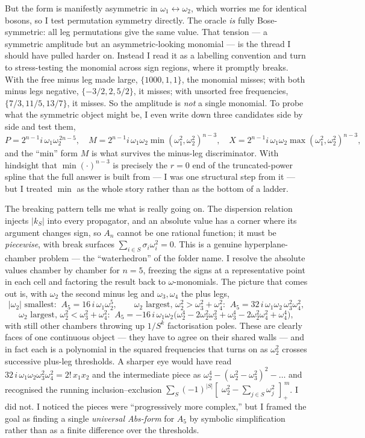 \documentclass{article}
\newcommand{\pp}[1]{\left[\,#1\,\right]_{+}}
\begin{document}
But the form is manifestly asymmetric in $\omega_1\leftrightarrow\omega_2$, which
worries me for identical bosons, so I test permutation symmetry directly. The
oracle \emph{is} fully Bose-symmetric: all leg permutations give the same value.
That tension --- a symmetric amplitude but an asymmetric-looking monomial --- is
the thread I should have pulled harder on. Instead I read it as a labelling
convention and turn to stress-testing the monomial across sign regions, where it
promptly breaks. With the free minus leg made large, $\{1000,1,1\}$, the
monomial misses; with both minus legs negative, $\{-3/2,2,5/2\}$, it misses; with
unsorted free frequencies, $\{7/3,11/5,13/7\}$, it misses. So the amplitude is
\emph{not} a single monomial. To probe what the symmetric object might be, I even
write down three candidates side by side and test them,
\[
P=2^{n-1}i\,\omega_1\omega_2^{\,2n-5},\quad
M=2^{n-1}i\,\omega_1\omega_2\min(\omega_1^2,\omega_2^2)^{n-3},\quad
X=2^{n-1}i\,\omega_1\omega_2\max(\omega_1^2,\omega_2^2)^{n-3},
\]
and the ``min'' form $M$ is what survives the minus-leg discriminator. With
hindsight that $\min(\cdot)^{n-3}$ is precisely the $r=0$ end of the
truncated-power spline that the full answer is built from --- I was one structural
step from it --- but I treated $\min$ as the whole story rather than as the bottom
of a ladder.

The breaking pattern tells me what is really going on. The dispersion relation
injects $|k_S|$ into every propagator, and an absolute value has a corner where
its argument changes sign, so $A_n$ cannot be one rational function; it must be
\emph{piecewise}, with break surfaces $\sum_{i\in S}\sigma_i\omega_i^2=0$. This is
a genuine hyperplane-chamber problem --- the ``waterhedron'' of the folder name.
I resolve the absolute values chamber by chamber for $n=5$, freezing the signs at
a representative point in each cell and factoring the result back to
$\omega$-monomials. The picture that comes out is, with $\omega_2$ the second
minus leg and $\omega_3,\omega_4$ the plus legs,
\[
\text{$|\omega_2|$ smallest:}\;\; A_5=16\,i\,\omega_1\omega_2^{5},\qquad
\text{$\omega_2$ largest, $\omega_2^2>\omega_3^2{+}\omega_4^2$:}\;\;
A_5=32\,i\,\omega_1\omega_2\,\omega_3^{2}\omega_4^{2},
\]
\[
\text{$\omega_2$ largest, $\omega_2^2<\omega_3^2{+}\omega_4^2$:}\;\;
A_5=-16\,i\,\omega_1\omega_2\big(\omega_2^{4}-2\omega_2^{2}\omega_3^{2}+\omega_3^{4}
-2\omega_2^{2}\omega_4^{2}+\omega_4^{4}\big),
\]
with still other chambers throwing up $1/S^k$ factorisation poles. These are
clearly faces of one continuous object --- they have to agree on their shared
walls --- and in fact each is a polynomial in the squared frequencies that turns
on as $\omega_2^2$ crosses successive plus-leg thresholds. A sharper eye would
have read $32\,i\,\omega_1\omega_2\omega_3^2\omega_4^2 = 2!\,x_1x_2$ and the
intermediate piece as $\omega_2^4-(\omega_2^2-\omega_3^2)^2-\dots$ and recognised
the running inclusion--exclusion $\sum_S(-1)^{|S|}\pp{\,\omega_2^2-\sum_{j\in S}\omega_j^2\,}^{\,m}$.
I did not. I noticed the pieces were ``progressively more complex,'' but I framed
the goal as finding a single \emph{universal Abs-form} for $A_5$ by symbolic
simplification rather than as a finite difference over the thresholds.
\end{document}
